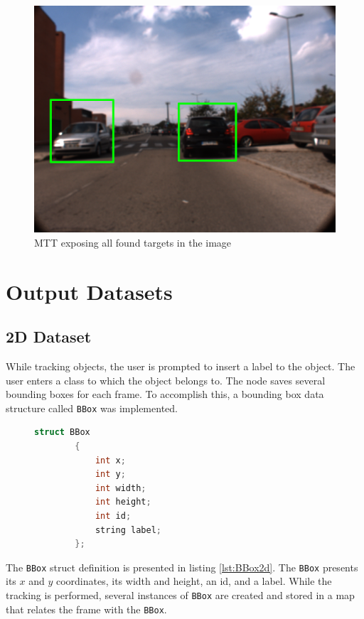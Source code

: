 \begin{figure}[htp]
	
	\centering
	\includegraphics[width=.7\textwidth]{caplabel/imgs/mtt_proj.png}
	
	\caption{MTT exposing all found targets in the image}
	\label{fig:mtt_proj}
	
\end{figure}

\section{Output Datasets}

\subsection{2D Dataset}

While tracking objects, the user is prompted to insert a label to the object. The user enters a class to which the object belongs to. The node saves several bounding boxes for each frame. To accomplish this, a bounding box data structure called \texttt{BBox} was implemented.

\begin{figure}
	\begin{center}
		\begin{lstlisting}[label={lst:BBox2d}, caption={BBox struct definition used for 2D datasets.},language=c++]
		struct BBox
		{
			int x;
			int y;
			int width;
			int height;
			int id;
			string label;
		};\end{lstlisting}
	\end{center}
\end{figure}

The \texttt{BBox} struct definition is presented in listing \ref{lst:BBox2d}. The \texttt{BBox} presents its $x$ and $y$ coordinates, its width and height, an id, and a label. While the tracking is performed, several instances of \texttt{BBox} are created and stored in a map that relates the frame with the \texttt{BBox}. 

